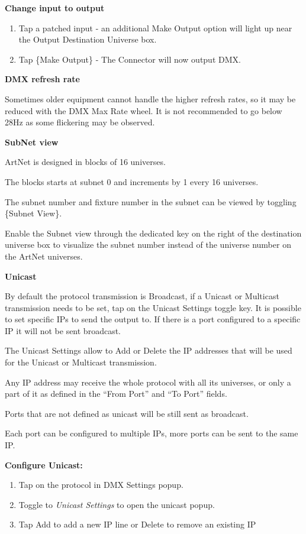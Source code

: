 \documentclass[
]{article}
\begin{document}
\textbf{Change input to output}

\begin{enumerate}
\def\labelenumi{\arabic{enumi}.}
\item
  Tap a patched input - an additional Make Output option will light up near the Output Destination Universe box.
\item
  Tap \{Make Output\} - The Connector will now output DMX.
\end{enumerate}

\textbf{DMX refresh rate}

Sometimes older equipment cannot handle the higher refresh rates, so it may be reduced with the DMX Max Rate wheel. It is not recommended to go below 28Hz as some flickering may be observed.

\textbf{SubNet view}

ArtNet is designed in blocks of 16 universes.

The blocks starts at subnet 0 and increments by 1 every 16 universes.

The subnet number and fixture number in the subnet can be viewed by toggling \{Subnet View\}.

Enable the Subnet view through the dedicated key on the right of the destination universe box to visualize the subnet number instead of the universe number on the ArtNet universes.

\textbf{Unicast}

By default the protocol transmission is Broadcast, if a Unicast or Multicast transmission needs to be set, tap on the Unicast Settings toggle key. It is possible to set specific IPs to send the output to. If there is a port configured to a specific IP it will not be sent broadcast.

The Unicast Settings allow to Add or Delete the IP addresses that will be used for the Unicast or Multicast transmission.

Any IP address may receive the whole protocol with all its universes, or only a part of it as defined in the ``From Port'' and ``To Port'' fields.

Ports that are not defined as unicast will be still sent as broadcast.

Each port can be configured to multiple IPs, more ports can be sent to the same IP.

\textbf{Configure Unicast:}

\begin{enumerate}
\def\labelenumi{\arabic{enumi}.}
\item
  Tap on the protocol in DMX Settings popup.
\item
  Toggle to \emph{Unicast Settings} to open the unicast popup.
\item
  Tap Add to add a new IP line or Delete to remove an existing IP
\end{enumerate}
\end{document}
